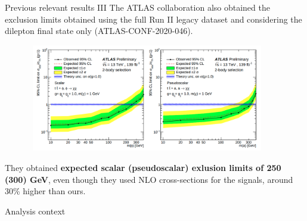 \documentclass[8pt]{beamer}
\begin{document}
\begin{frame}{Previous relevant results III}
\justifying
The ATLAS collaboration also obtained the exclusion limits obtained using the full Run II legacy dataset and considering the dilepton final state only (ATLAS-CONF-2020-046). \vfill

 \begin{figure}[htbp]
\centering
\includegraphics[width=10.5cm, height=4.7cm]{figs/ATLASICHEP.png}
\end{figure} \vfill

They obtained \textbf{expected scalar (pseudoscalar) exlusion limits of 250 (300) GeV}, even though  they used NLO cross-sections for the signals, around 30\% higher than ours. \vfill
\end{frame}












\begin{frame}[standout]
Analysis context
\end{frame}
\end{document}

